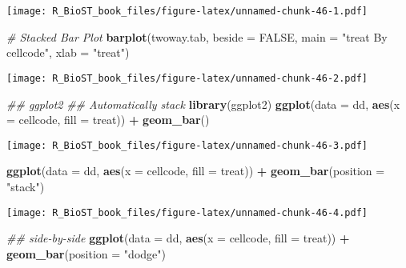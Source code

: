 \documentclass[
]{book}
\newenvironment{Shaded}{\begin{snugshade}}{\end{snugshade}}
\newcommand{\CommentTok}[1]{\textcolor[rgb]{0.56,0.35,0.01}{\textit{#1}}}
\newcommand{\DataTypeTok}[1]{\textcolor[rgb]{0.13,0.29,0.53}{#1}}
\newcommand{\KeywordTok}[1]{\textcolor[rgb]{0.13,0.29,0.53}{\textbf{#1}}}
\newcommand{\NormalTok}[1]{#1}
\newcommand{\OperatorTok}[1]{\textcolor[rgb]{0.81,0.36,0.00}{\textbf{#1}}}
\newcommand{\OtherTok}[1]{\textcolor[rgb]{0.56,0.35,0.01}{#1}}
\newcommand{\StringTok}[1]{\textcolor[rgb]{0.31,0.60,0.02}{#1}}
\begin{document}
\texttt{[image: R\_BioST\_book\_files/figure-latex/unnamed-chunk-46-1.pdf]}

\begin{Shaded}
\begin{Highlighting}[]
\CommentTok{\# Stacked Bar Plot}
\KeywordTok{barplot}\NormalTok{(twoway.tab,}
        \DataTypeTok{beside =} \OtherTok{FALSE}\NormalTok{, }
        \DataTypeTok{main =} \StringTok{"treat By cellcode"}\NormalTok{,}
        \DataTypeTok{xlab =} \StringTok{"treat"}\NormalTok{)}
\end{Highlighting}
\end{Shaded}

\texttt{[image: R\_BioST\_book\_files/figure-latex/unnamed-chunk-46-2.pdf]}

\begin{Shaded}
\begin{Highlighting}[]
\CommentTok{\#\# ggplot2}
\CommentTok{\#\# Automatically stack}
\KeywordTok{library}\NormalTok{(ggplot2)}
\KeywordTok{ggplot}\NormalTok{(}\DataTypeTok{data =}\NormalTok{ dd, }\KeywordTok{aes}\NormalTok{(}\DataTypeTok{x =}\NormalTok{ cellcode, }\DataTypeTok{fill =}\NormalTok{ treat)) }\OperatorTok{+}\StringTok{ }
\StringTok{  }\KeywordTok{geom\_bar}\NormalTok{()}
\end{Highlighting}
\end{Shaded}

\texttt{[image: R\_BioST\_book\_files/figure-latex/unnamed-chunk-46-3.pdf]}

\begin{Shaded}
\begin{Highlighting}[]
\KeywordTok{ggplot}\NormalTok{(}\DataTypeTok{data =}\NormalTok{ dd, }\KeywordTok{aes}\NormalTok{(}\DataTypeTok{x =}\NormalTok{ cellcode, }\DataTypeTok{fill =}\NormalTok{ treat)) }\OperatorTok{+}
\StringTok{  }\KeywordTok{geom\_bar}\NormalTok{(}\DataTypeTok{position =} \StringTok{"stack"}\NormalTok{)}
\end{Highlighting}
\end{Shaded}

\texttt{[image: R\_BioST\_book\_files/figure-latex/unnamed-chunk-46-4.pdf]}

\begin{Shaded}
\begin{Highlighting}[]
\CommentTok{\#\# side{-}by{-}side }
\KeywordTok{ggplot}\NormalTok{(}\DataTypeTok{data =}\NormalTok{ dd, }\KeywordTok{aes}\NormalTok{(}\DataTypeTok{x =}\NormalTok{ cellcode, }\DataTypeTok{fill =}\NormalTok{ treat)) }\OperatorTok{+}\StringTok{ }
\StringTok{  }\KeywordTok{geom\_bar}\NormalTok{(}\DataTypeTok{position =} \StringTok{"dodge"}\NormalTok{)}
\end{Highlighting}
\end{Shaded}
\end{document}
